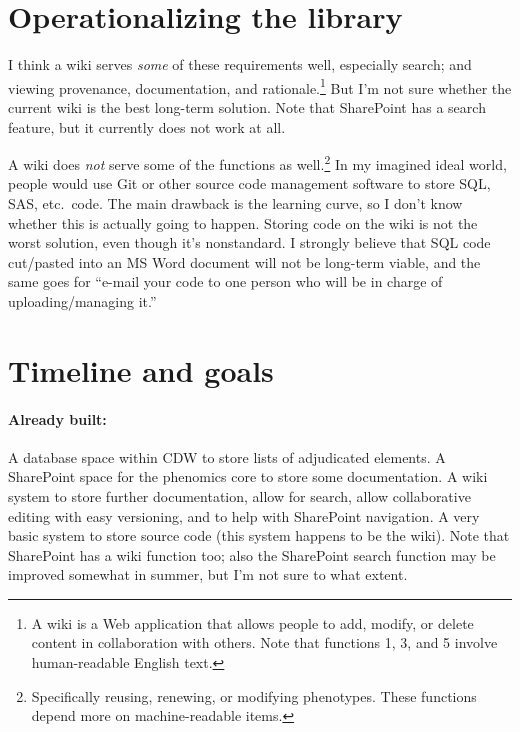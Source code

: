 \documentclass{tufte-handout}
\begin{document}
\section{Operationalizing the library}

I think a wiki serves \emph{some} of these requirements well,
especially search; and viewing provenance, documentation, and
rationale.\footnote{A wiki is a Web application that allows people to
  add, modify, or delete content in collaboration with others. Note
  that functions 1, 3, and 5 involve human-readable English text.} But
I'm not sure whether the current wiki is the best long-term solution.
Note that SharePoint has a search feature, but it currently does not
work at all.

A wiki does \emph{not} serve some of the functions as
well.\footnote{Specifically reusing, renewing, or modifying
  phenotypes. These functions depend more on machine-readable items.}
In my imagined ideal world, people would use Git or other source code
management software to store SQL, SAS, etc.\ code. The main drawback
is the learning curve, so I don't know whether this is actually going
to happen. Storing code on the wiki is not the worst solution, even
though it's nonstandard. I strongly believe that SQL code cut/pasted
into an MS Word document will not be long-term viable, and the same
goes for ``e-mail your code to one person who will be in charge of
uploading/managing it.''


\section{Timeline and goals}

\paragraph{Already built:}
A database space within CDW to store lists of adjudicated elements. A
SharePoint space for the phenomics core to store some documentation. A
wiki system to store further documentation, allow for search, allow
collaborative editing with easy versioning, and to help with
SharePoint navigation. A very basic system to store source code (this
system happens to be the wiki). Note that SharePoint has a wiki
function too; also the SharePoint search function may be improved
somewhat in summer, but I'm not sure to what extent.
\end{document}
